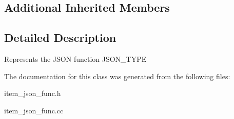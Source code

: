 \subsection*{Additional Inherited Members}


\subsection{Detailed Description}
Represents the J\+S\+ON function J\+S\+O\+N\+\_\+\+T\+Y\+PE 

The documentation for this class was generated from the following files\+:\begin{DoxyCompactItemize}
\item 
item\+\_\+json\+\_\+func.\+h\item 
item\+\_\+json\+\_\+func.\+cc\end{DoxyCompactItemize}
